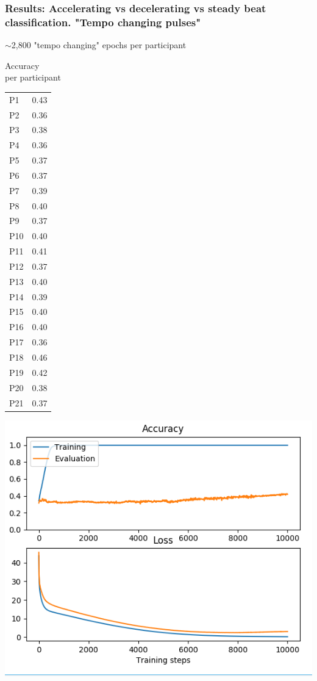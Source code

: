 \documentclass{beamer}
\begin{document}
\begin{frame}
	\frametitle{Results: Accelerating vs decelerating vs steady beat classification. "Tempo changing pulses"}

	$\mathtt{\sim}$2,800 "tempo changing" epochs per participant

	\begin{minipage}{0.3\linewidth}
	Accuracy \\
	per participant
	\begin{table}
	\tiny
	\begin{tabular}{l|l}
		P1 & 0.43 \\
		P2 & 0.36 \\
		P3 & 0.38 \\
		P4 & 0.36 \\
		P5 & 0.37 \\
		P6 & 0.37 \\
		P7 & 0.39 \\
		P8 & 0.40 \\
		P9 & 0.37 \\
		P10 & 0.40 \\
		P11 & 0.41 \\
		P12 & 0.37 \\
		P13 & 0.40 \\
		P14 & 0.39 \\
		P15 & 0.40 \\
		P16 & 0.40 \\
		P17 & 0.36 \\
		P18 & 0.46 \\
		P19 & 0.42 \\
		P20 & 0.38 \\
		P21 & 0.37 \\
	\end{tabular}
	\end{table}
	\end{minipage}
	\begin{minipage}{0.6\linewidth}
		\centering
		\includegraphics[scale=0.5]{fig18.png}
	\end{minipage}

\end{frame}
\end{document}

